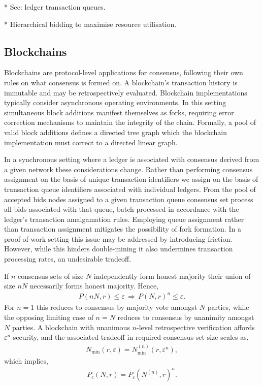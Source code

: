 * Sec: ledger transaction queues.

* Hierarchical bidding to maximise resource utilisation.

\subsection{Blockchains}

Blockchains are protocol-level applications for consensus, following their own rules on what consensus is formed on. A blockchain's transaction history is immutable and may be retrospectively evaluated. Blockchain implementations typically consider asynchronous operating environments. In this setting simultaneous block additions manifest themselves as forks, requiring error correction mechanisms to maintain the integrity of the chain. Formally, a pool of valid block additions defines a directed tree graph which the blockchain implementation must correct to a directed linear graph.

In a synchronous setting where a ledger is associated with consensus derived from a given network these considerations change. Rather than performing consensus assignment on the basis of unique transaction identifiers we assign on the basis of transaction queue identifiers associated with individual ledgers. From the pool of accepted bids nodes assigned to a given transaction queue consensus set process all bids associated with that queue, batch processed in accordance with the ledger's transaction amalgamation rules. Employing queue assignment rather than transaction assignment mitigates the possibility of fork formation. In a proof-of-work setting this issue may be addressed by introducing friction. However, while this hinders double-mining it also undermines transaction processing rates, an undesirable tradeoff.

If $n$ consensus sets of size $N$ independently form honest majority their union of size $nN$ necessarily forms honest majority. Hence,
\begin{align}
	P(nN,r)\leq\varepsilon \,\Rightarrow\, P(N,r)^n\leq\varepsilon.
\end{align}
For $n=1$ this reduces to consensus by majority vote amongst $N$ parties, while the opposing limiting case of $n=N$ reduces to consensus by unanimity amongst $N$ parties. A blockchain with unanimous $n$-level retrospective verification affords $\varepsilon^n$-security, and the associated tradeoff in required consensus set size scales as,
\begin{align}
	N_\mathrm{min}(r,\varepsilon) = N_\mathrm{min}^{(n)}(r,\varepsilon^n),
\end{align}
which implies,
\begin{align}
	P_c(N,r) = P_c(N^{(n)},r)^n.
\end{align}

